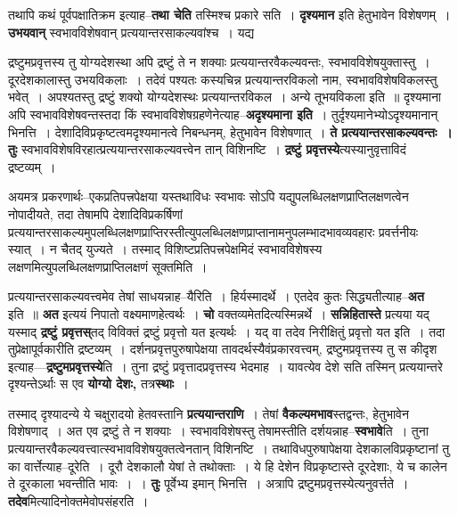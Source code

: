 \documentclass[article,12pt,a4paper]{memoir}
\begin{document}
	  \pstart तथापि कथं पूर्वपक्षातिक्रम इत्याह--\textbf{तथा चेति} तस्मिश्च प्रकारे सति । \textbf{दृश्यमान} इति हेतुभावेन विशेषणम् । \textbf{उभयवान्} स्वभावविशेषवान् प्रत्ययान्तरसाकल्यवांश्च । यद्य  \leavevmode{} 
	  
	द्रष्टुमप्रवृत्तस्य तु योग्यदेशस्था अपि द्रष्टुं ते न शक्याः प्रत्ययान्तरवैकल्यवन्तः, स्वभावविशेषयुक्तास्तु । दूरदेशकालास्तु उभयविकलाः । तदेवं पश्यतः कस्यचिन्न प्रत्ययान्तरविकलो नाम, स्वभावविशेषविकलस्तु भवेत् । अपश्यतस्तु द्रष्टुं शक्यो योग्यदेशस्थः प्रत्ययान्तरविकल । अन्ये तूभयविकला इति ॥ दृश्यमाना अपि स्वभावविशेषवन्तस्तदा किं स्वभावविशेषग्रहणेनेत्याह--\textbf{अदृश्यमाना इति} । तुर्दृश्यमानेभ्योऽदृश्यमानान् भिनत्ति । देशादिविप्रकृष्टत्वमदृश्यमानत्वे निबन्धनम्, हेतुभावेन विशेषणात् । \textbf{ते प्रत्ययान्तरसाकल्यवन्तः । तुः} स्वभावविशेषविरहात्प्रत्ययान्तरसाकल्यवत्त्वेन तान् विशिनष्टि । \textbf{द्रष्टुं प्रवृत्तस्ये}त्यस्यानुवृत्ताविदं द्रष्टव्यम् ।
	\pend
      

	  \pstart अयमत्र प्रकरणार्थः--एकप्रतिपत्त्रपेक्षया यस्तथाविधः स्वभावः सोऽपि यद्युपलब्धिलक्षणप्राप्तिलक्षणत्वेन नोपादीयते, तदा तेषामपि देशादिविप्रकर्षिणां प्रत्ययान्तरसाकल्यमुपलब्धिलक्षणप्राप्तिरस्तीत्युपलब्धिलक्षणप्राप्तानामनुपलम्भादभावव्यवहारः प्रवर्त्तनीयः स्यात् । न चैतद् युज्यते । तस्माद् विशिष्टप्रतिपत्त्रपेक्षमिदं स्वभावविशेषस्य लक्षणमित्युपलब्धिलक्षणप्राप्तिलक्षणं सूक्तमिति ।
	\pend
      

	  \pstart प्रत्ययान्तरसाकल्यवत्त्वमेव तेषां साधयन्नाह--यैरिति । हिर्यस्मादर्थे । एतदेव कुतः सिद्ध्यतीत्याह--\textbf{अत} इति ॥ \textbf{अत} इत्ययं निपातो वक्ष्यमाणहेत्वर्थः । \textbf{चो} वक्तव्यमेतदित्यस्मिन्नर्थे । \textbf{सन्निहितास्ते} प्रत्यया यद् यस्माद् \textbf{द्रष्टुं प्रवृत्तस्}तद् विविक्तं द्रष्टुं प्रवृत्तो यत इत्यर्थः । यद् वा तदेव निरीक्षितुं प्रवृत्तो यत इति । तदा तु\leavevmode{}प्रेक्षापूर्वकारीति द्रष्टव्यम् । दर्शनप्रवृत्तपुरुषापेक्षया तावदर्थस्यैवंप्रकारवत्त्वम्, द्रष्टुमप्रवृत्तस्य तु स कीदृश इत्याह—\textbf{द्रष्टुमप्रवृत्तस्ये}ति । तुना द्रष्टुं प्रवृत्तादप्रवृत्तस्य भेदमाह । यावत्येव देशे सति तस्मिन् प्रत्ययान्तरे दृश्यन्तेऽर्थाः स एव \textbf{योग्यो देशः,} तत्र\textbf{स्थाः} ।
	\pend
      

	  \pstart तस्माद् दृश्यादन्ये ये चक्षुरादयो हेतवस्तानि \textbf{प्रत्ययान्तराणि} । तेषां \textbf{वैकल्यमभाव}स्तद्वन्तः, हेतुभावेन विशेषणाद् । अत एव द्रष्टुं ते न शक्याः । स्वभावविशेषस्तु तेषामस्तीति दर्शयन्नाह--\textbf{स्वभावे}ति । तुना प्रत्ययान्तरवैकल्यवत्त्वात्स्वभावविशेषयुक्तत्वेनतान् विशिनष्टि । तथाविधपुरुषापेक्षया देशकालविप्रकृष्टानां तु का वार्त्तेत्याह--दूरेति । दूरौ देशकालौ येषां ते तथोक्ताः । ये हि देशेन विप्रकृष्टास्ते दूरदेशाः, ये च कालेन ते दूरकाला भवन्तीति भावः । । \textbf{तुः} पूर्वेभ्य इमान् भिनत्ति । अत्रापि द्रष्टुमप्रवृत्तस्येत्यनुवर्त्तते । \textbf{तदेव}मित्यादिनोक्तमेवोपसंहरति ।
	\pend
      
\end{document}
